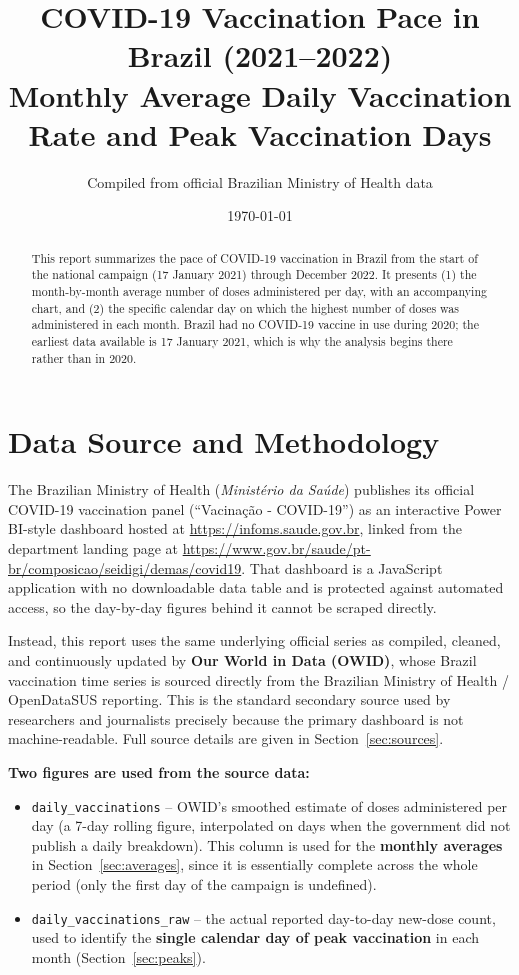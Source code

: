 \documentclass[11pt]{article}
\title{\textbf{COVID-19 Vaccination Pace in Brazil (2021--2022)} \\[4pt]
\large Monthly Average Daily Vaccination Rate and Peak Vaccination Days}
\author{Compiled from official Brazilian Ministry of Health data}
\date{\today}
\begin{document}
\maketitle

\begin{abstract}
\noindent This report summarizes the pace of COVID-19 vaccination in Brazil from the start of the
national campaign (17 January 2021) through December 2022. It presents (1) the month-by-month
average number of doses administered per day, with an accompanying chart, and (2) the specific
calendar day on which the highest number of doses was administered in each month. Brazil had no
COVID-19 vaccine in use during 2020; the earliest data available is 17 January 2021, which is why
the analysis begins there rather than in 2020.
\end{abstract}

\section{Data Source and Methodology}
\label{sec:methodology}

The Brazilian Ministry of Health (\emph{Minist\'erio da Sa\'ude}) publishes its official COVID-19
vaccination panel (``Vacina\c{c}\~ao - COVID-19'') as an interactive Power BI-style dashboard hosted at
\url{https://infoms.saude.gov.br}, linked from the department landing page at
\url{https://www.gov.br/saude/pt-br/composicao/seidigi/demas/covid19}. That dashboard is a
JavaScript application with no downloadable data table and is protected against automated access,
so the day-by-day figures behind it cannot be scraped directly.

Instead, this report uses the same underlying official series as compiled, cleaned, and continuously
updated by \textbf{Our World in Data (OWID)}, whose Brazil vaccination time series is sourced directly
from the Brazilian Ministry of Health / OpenDataSUS reporting. This is the standard secondary source
used by researchers and journalists precisely because the primary dashboard is not machine-readable.
Full source details are given in Section~\ref{sec:sources}.

\textbf{Two figures are used from the source data:}
\begin{itemize}[nosep]
    \item \texttt{daily\_vaccinations} -- OWID's smoothed estimate of doses administered per day
    (a 7-day rolling figure, interpolated on days when the government did not publish a daily
    breakdown). This column is used for the \textbf{monthly averages} in Section~\ref{sec:averages},
    since it is essentially complete across the whole period (only the first day of the campaign is
    undefined).
    \item \texttt{daily\_vaccinations\_raw} -- the actual reported day-to-day new-dose count, used to
    identify the \textbf{single calendar day of peak vaccination} in each month (Section~\ref{sec:peaks}).
\end{itemize}
\end{document}
